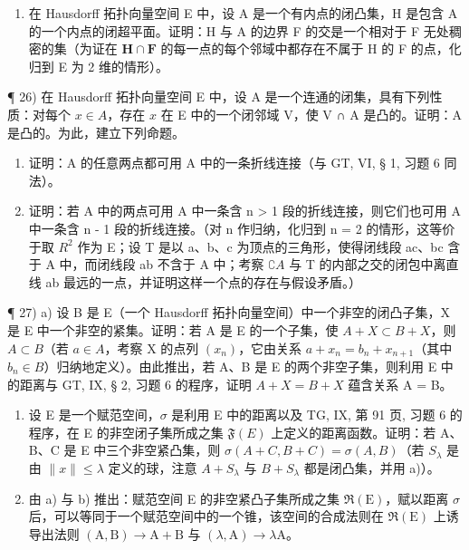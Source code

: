 \begin{enumerate}
\def\labelenumi{\alph{enumi})}
\setcounter{enumi}{1}
\tightlist
\item
  在 Hausdorff 拓扑向量空间 E 中，设 A 是一个有内点的闭凸集，H 是包含 A 的一个内点的闭超平面。证明：H 与 A 的边界 F 的交是一个相对于 F 无处稠密的集（为证在 \(\mathbf{H} \cap \mathbf{F}\) 的每一点的每个邻域中都存在不属于 H 的 F 的点，化归到 E 为 2 维的情形）。
\end{enumerate}

¶ 26) 在 Hausdorff 拓扑向量空间 E 中，设 A 是一个连通的闭集，具有下列性质：对每个 \(x \in A\)，存在 \(x\) 在 E 中的一个闭邻域 V，使 V ∩ A 是凸的。证明：A 是凸的。为此，建立下列命题。

\begin{enumerate}
\def\labelenumi{\alph{enumi})}
\item
  证明：A 的任意两点都可用 A 中的一条折线连接（与 GT, VI, § 1, 习题 6 同法）。
\item
  证明：若 A 中的两点可用 A 中一条含 n > 1 段的折线连接，则它们也可用 A 中一条含 n - 1 段的折线连接。（对 n 作归纳，化归到 n = 2 的情形，这等价于取 \(R^{2}\) 作为 E；设 T 是以 a、b、c 为顶点的三角形，使得闭线段 ac、bc 含于 A 中，而闭线段 ab 不含于 A 中；考察 \(\complement A\) 与 T 的内部之交的闭包中离直线 ab 最远的一点，并证明这样一个点的存在与假设矛盾。）
\end{enumerate}

¶ 27) a) 设 B 是 E（一个 Hausdorff 拓扑向量空间）中一个非空的闭凸子集，X 是 E 中一个非空的紧集。证明：若 A 是 E 的一个子集，使 \(A + X \subset B + X\)，则 \(A \subset B\)（若 \(a \in A\)，考察 X 的点列 \((x_{n})\)，它由关系 \(a + x_{n} = b_{n} + x_{n+1}\)（其中 \(b_{n} \in B\)）归纳地定义）。由此推出，若 A、B 是 E 的两个非空子集，则利用 E 中的距离与 GT, IX, § 2, 习题 6 的程序，证明 \(A + X = B + X\) 蕴含关系 A = B。

\begin{enumerate}
\def\labelenumi{\alph{enumi})}
\setcounter{enumi}{1}
\item
  设 E 是一个赋范空间，\(\sigma\) 是利用 E 中的距离以及 TG, IX, 第 91 页, 习题 6 的程序，在 E 的非空闭子集所成之集 \(\mathfrak{F}(E)\) 上定义的距离函数。证明：若 A、B、C 是 E 中三个非空紧凸集，则 \(\sigma(A+C, B+C)=\sigma(A, B)\)（若 \(S_{\lambda}\) 是由 \(\|x\|\leqslant\lambda\) 定义的球，注意 \(A+S_{\lambda}\) 与 \(B+S_{\lambda}\) 都是闭凸集，并用 a)）。
\item
  由 a) 与 b) 推出：赋范空间 E 的非空紧凸子集所成之集 \(\Re(\mathrm{E})\)，赋以距离 \(\sigma\) 后，可以等同于一个赋范空间中的一个锥，该空间的合成法则在 \(\Re(\mathrm{E})\) 上诱导出法则 \((\mathrm{A}, \mathrm{B}) \to \mathrm{A} + \mathrm{B}\) 与 \((\lambda, \mathrm{A}) \to \lambda\mathrm{A}\)。
\end{enumerate}

